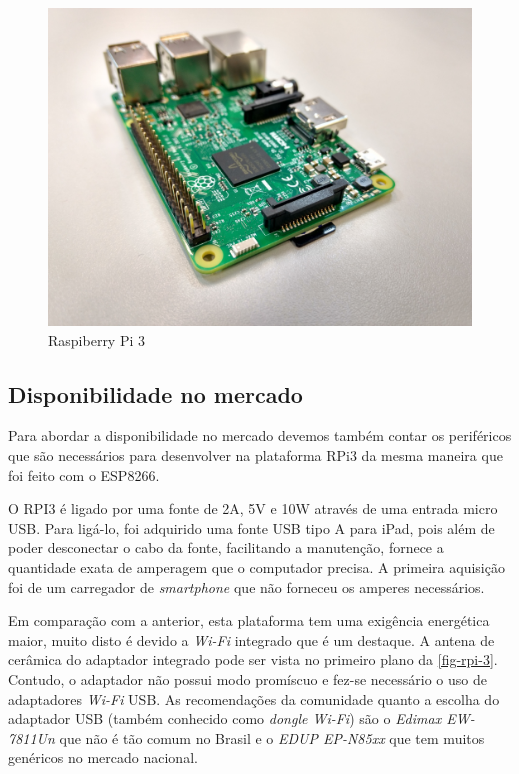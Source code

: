 \begin{figure}[htb]
	\caption{\label{fig-rpi-3}Raspiberry Pi 3 }
	\begin{center}
		\includegraphics[width=1\textwidth]{040-plataformas/RPi-WiFi-dongles/rpi-onboard.jpg}
	\end{center}
\end{figure}



\subsection{Disponibilidade no mercado}
\label{subsec:mercado-esp}

Para abordar a disponibilidade no mercado devemos também contar os periféricos
que são necessários para desenvolver na plataforma  RPi3 da mesma maneira que
foi feito com o ESP8266.

O RPI3 é ligado por uma fonte de 2A, 5V e 10W através de uma entrada micro
USB. Para ligá-lo, foi adquirido uma fonte USB tipo A para iPad, pois além de
poder desconectar o cabo da fonte, facilitando a manutenção, fornece a
quantidade exata de amperagem que o computador precisa. A primeira aquisição foi
de um carregador de \emph{smartphone} que não forneceu os amperes necessários.

Em comparação com a anterior, esta plataforma tem uma exigência energética maior,
muito disto é devido a \emph{Wi-Fi} integrado que é um destaque.
A antena de cerâmica do adaptador integrado pode ser vista no primeiro plano da
\autoref{fig-rpi-3}. Contudo, o adaptador não possui modo promíscuo e fez-se
necessário o uso de adaptadores \emph{Wi-Fi} USB. As recomendações da comunidade
quanto a escolha do adaptador USB (também conhecido como \emph{dongle Wi-Fi})
são o \emph{Edimax EW-7811Un} que não é tão comum no Brasil e o
\emph{EDUP EP-N85xx} que tem muitos genéricos no mercado nacional.

